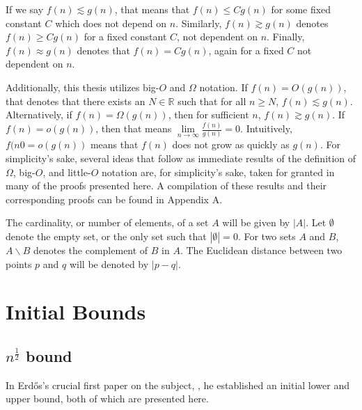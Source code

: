 \documentclass{scrippsthesisclass}
\theoremstyle{definition}
\begin{document}
If we say $f(n) \lesssim g(n)$, that means that $f(n) \leq Cg(n)$ for some fixed constant $C$ which does not depend on $n$. 
Similarly, $f(n) \gtrsim g(n)$ denotes $f(n) \geq Cg(n)$ for a fixed constant $C$, not dependent on $n$.
Finally, $f(n) \approx g(n)$ denotes that $f(n) = Cg(n)$, again for a fixed $C$ not dependent on $n$. 

Additionally, this thesis utilizes big-$O$ and $\Omega$ notation. 
If $f(n) = O(g(n))$, that denotes that there exists an $N \in \mathbb{R}$ such that for all $n \geq N$, $f(n) \lesssim g(n)$. 
Alternatively, if $f(n) = \Omega(g(n))$, then for sufficient $n$, $f(n) \gtrsim g(n)$. 
If $f(n) = o(g(n))$, then that means $\lim \limits_{n \to \infty} \frac{f(n)}{g(n)} = 0$. 
Intuitively, $f(n0 = o(g(n))$ means that $f(n)$ does not grow as quickly as $g(n)$.
For simplicity's sake, several ideas that follow as immediate results of the definition of $\Omega$, big-$O$, and little-$O$ notation are, for simplicity's sake, taken for granted in many of the proofs presented here. 
A compilation of these results and their corresponding proofs can be found in Appendix A. 

The cardinality, or number of elements, of a set $A$ will be given by $|A|$. 
Let $\emptyset$ denote the empty set, or the only set such that $|\emptyset| = 0$. 
For two sets $A$ and $B$, $A\backslash B$ denotes the complement of $B$ in $A$. 
The Euclidean distance between two points $p$ and $q$ will be denoted by $|p - q|$. 
\chapter{Initial Bounds}
\section{$n^{\frac{1}{2}}$ bound}

In Erd\H{o}s's crucial first paper on the subject, \cite{Erdos46}, he established an initial lower and upper bound, both of which are presented here. 
\end{document}
